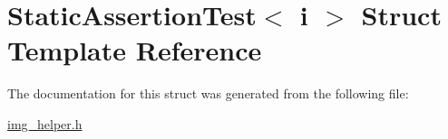 \hypertarget{struct_static_assertion_test}{}\section{Static\+Assertion\+Test$<$ i $>$ Struct Template Reference}
\label{struct_static_assertion_test}


The documentation for this struct was generated from the following file\+:\begin{DoxyCompactItemize}
\item 
\hyperlink{img__helper_8h}{img\+\_\+helper.\+h}\end{DoxyCompactItemize}
